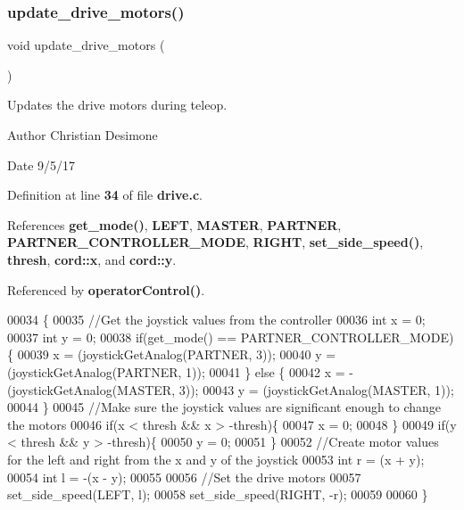 \subsubsection{update\+\_\+drive\+\_\+motors()}
{\footnotesize\ttfamily void update\+\_\+drive\+\_\+motors (\begin{DoxyParamCaption}{ }\end{DoxyParamCaption})}



Updates the drive motors during teleop. 

\begin{DoxyAuthor}{Author}
Christian Desimone 
\end{DoxyAuthor}
\begin{DoxyDate}{Date}
9/5/17 
\end{DoxyDate}


Definition at line \textbf{ 34} of file \textbf{ drive.\+c}.



References \textbf{ get\+\_\+mode()}, \textbf{ L\+E\+FT}, \textbf{ M\+A\+S\+T\+ER}, \textbf{ P\+A\+R\+T\+N\+ER}, \textbf{ P\+A\+R\+T\+N\+E\+R\+\_\+\+C\+O\+N\+T\+R\+O\+L\+L\+E\+R\+\_\+\+M\+O\+DE}, \textbf{ R\+I\+G\+HT}, \textbf{ set\+\_\+side\+\_\+speed()}, \textbf{ thresh}, \textbf{ cord\+::x}, and \textbf{ cord\+::y}.



Referenced by \textbf{ operator\+Control()}.


\begin{DoxyCode}
00034                           \{
00035   \textcolor{comment}{//Get the joystick values from the controller}
00036   \textcolor{keywordtype}{int} x = 0;
00037   \textcolor{keywordtype}{int} y = 0;
00038   \textcolor{keywordflow}{if}(get_mode() == PARTNER_CONTROLLER_MODE) \{
00039     x = (joystickGetAnalog(PARTNER, 3));
00040     y = (joystickGetAnalog(PARTNER, 1));
00041   \} \textcolor{keywordflow}{else} \{
00042     x = -(joystickGetAnalog(MASTER, 3));
00043     y = (joystickGetAnalog(MASTER, 1));
00044   \}
00045   \textcolor{comment}{//Make sure the joystick values are significant enough to change the motors}
00046   \textcolor{keywordflow}{if}(x < thresh && x > -thresh)\{
00047     x = 0;
00048   \}
00049   \textcolor{keywordflow}{if}(y < thresh && y > -thresh)\{
00050     y = 0;
00051   \}
00052   \textcolor{comment}{//Create motor values for the left and right from the x and y of the joystick}
00053   \textcolor{keywordtype}{int} r = (x + y);
00054   \textcolor{keywordtype}{int} l = -(x - y);
00055 
00056   \textcolor{comment}{//Set the drive motors}
00057   set_side_speed(LEFT, l);
00058   set_side_speed(RIGHT, -r);
00059 
00060 \}
\end{DoxyCode}


